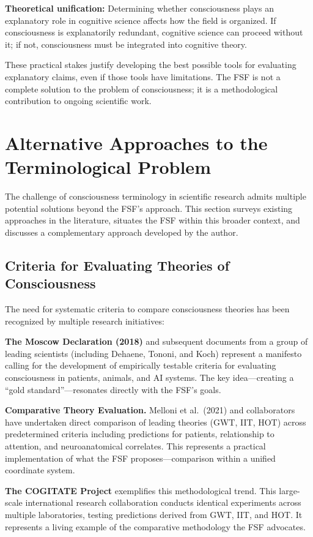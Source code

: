 \documentclass[12pt,a4paper]{article}
\begin{document}
\textbf{Theoretical unification:} Determining whether consciousness plays an explanatory role in cognitive science affects how the field is organized. If consciousness is explanatorily redundant, cognitive science can proceed without it; if not, consciousness must be integrated into cognitive theory.

These practical stakes justify developing the best possible tools for evaluating explanatory claims, even if those tools have limitations. The FSF is not a complete solution to the problem of consciousness; it is a methodological contribution to ongoing scientific work.

\section{Alternative Approaches to the Terminological Problem}

The challenge of consciousness terminology in scientific research admits multiple potential solutions beyond the FSF's approach. This section surveys existing approaches in the literature, situates the FSF within this broader context, and discusses a complementary approach developed by the author.

\subsection{Criteria for Evaluating Theories of Consciousness}

The need for systematic criteria to compare consciousness theories has been recognized by multiple research initiatives:

\textbf{The Moscow Declaration (2018)} and subsequent documents from a group of leading scientists (including Dehaene, Tononi, and Koch) represent a manifesto calling for the development of empirically testable criteria for evaluating consciousness in patients, animals, and AI systems. The key idea---creating a ``gold standard''---resonates directly with the FSF's goals.

\textbf{Comparative Theory Evaluation.} Melloni et al.\ (2021) and collaborators have undertaken direct comparison of leading theories (GWT, IIT, HOT) across predetermined criteria including predictions for patients, relationship to attention, and neuroanatomical correlates. This represents a practical implementation of what the FSF proposes---comparison within a unified coordinate system.

\textbf{The COGITATE Project} exemplifies this methodological trend. This large-scale international research collaboration conducts identical experiments across multiple laboratories, testing predictions derived from GWT, IIT, and HOT. It represents a living example of the comparative methodology the FSF advocates.
\end{document}
